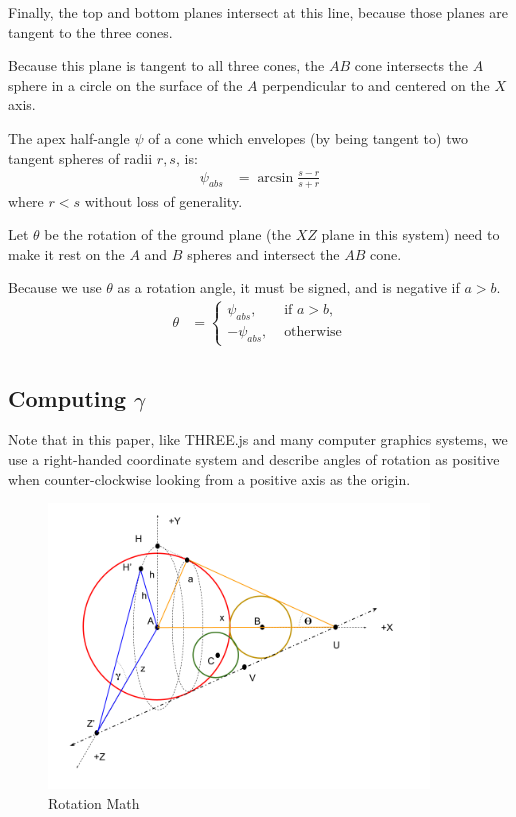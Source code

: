 \documentclass{article}
\begin{document}
Finally, the top and bottom planes
intersect at this line, because those planes are tangent to the three cones.

Because this plane is tangent to all three cones,
the $AB$ cone intersects
the $A$ sphere in a circle on the surface of the $A$ perpendicular to and centered on the $X$ axis.

The apex half-angle $\psi$ of a cone which envelopes (by being tangent to) two tangent
spheres of radii $r,s$, is:
\begin{align}
 \psi_{abs} &= \arcsin{\frac{s - r}{s + r}}
\end{align}
where $r < s$ without loss of generality.

Let $\theta$ be the rotation of the ground plane (the $XZ$ plane in this system) need to make
it rest on the $A$ and $B$ spheres and intersect the $AB$ cone.

Because we use $\theta$ as a rotation angle, it must be signed, and is
negative if $a > b$.
\begin{align}
  \theta &= \begin{cases}
    \psi_{abs}, & \text{ if $a > b$, } \\
    -\psi_{abs}, & \text{  otherwise}
\end{cases} \label{eq:theta} \\
\end{align}


\subsection{Computing $\gamma$}

Note that in this paper, like THREE.js\cite{dirksen2018learn} and many computer graphics systems,
we use a right-handed coordinate system and describe angles of rotation as
positive when counter-clockwise looking from a positive axis as the origin.

\begin{figure}
     \centering
     \includegraphics[width=0.9\textwidth]{figures/RotationMathII.png}
     \caption{Rotation Math}
  \label{fig:rotation}
\end{figure}
\end{document}
